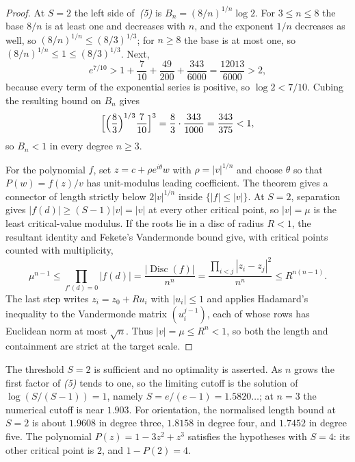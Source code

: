 \begin{proof}
At $S=2$ the left side of~\emph{(5)} is $B_n=(8/n)^{1/n}\log2$.  For
$3\le n\le8$ the base $8/n$ is at least one and decreases with $n$, and the
exponent $1/n$ decreases as well, so $(8/n)^{1/n}\le(8/3)^{1/3}$; for $n\ge8$
the base is at most one, so $(8/n)^{1/n}\le1\le(8/3)^{1/3}$.  Next,
\[
 e^{7/10}>1+\frac7{10}+\frac{49}{200}+\frac{343}{6000}
        =\frac{12013}{6000}>2,
\]
because every term of the exponential series is positive, so $\log2<7/10$.
Cubing the resulting bound on $B_n$ gives
\[
 \Bigl[\Bigl(\frac83\Bigr)^{1/3}\frac7{10}\Bigr]^{3}
 =\frac83\cdot\frac{343}{1000}=\frac{343}{375}<1,
\]
so $B_n<1$ in every degree $n\ge3$.

For the polynomial $f$, set $z=c+\rho e^{i\theta}w$ with
$\rho=|v|^{1/n}$ and choose $\theta$ so that $P(w)=f(z)/v$ has
unit-modulus leading coefficient.  The theorem gives a connector of length
strictly below $2|v|^{1/n}$ inside $\{|f|\le|v|\}$.  At $S=2$, separation
gives $|f(d)|\ge(S-1)|v|=|v|$ at every other critical point, so $|v|=\mu$ is
the least critical-value modulus.  If the roots lie in a disc of radius
$R<1$, the resultant identity and Fekete's Vandermonde bound give, with
critical points counted with multiplicity,
\[
 \mu^{n-1}
 \le \prod_{f'(d)=0}|f(d)|
 =\frac{|\operatorname{Disc}(f)|}{n^n}
 =\frac{\prod_{i<j}|z_i-z_j|^2}{n^n}
 \le R^{n(n-1)}.
\]
The last step writes $z_i=z_0+Ru_i$ with $|u_i|\le1$ and applies Hadamard's
inequality to the Vandermonde matrix $(u_i^{j-1})$, each of whose rows has
Euclidean norm at most $\sqrt n$.  Thus $|v|=\mu\le R^n<1$, so both the length
and containment are strict at the target scale.
\end{proof}

The threshold $S=2$ is sufficient and no optimality is asserted.  As $n$ grows
the first factor of \emph{(5)} tends to one, so the limiting cutoff is the
solution of $\log(S/(S-1))=1$, namely $S=e/(e-1)=1.5820\ldots$; at $n=3$ the
numerical cutoff is near $1.903$.  For orientation, the normalised length bound at
$S=2$ is about $1.9608$ in degree three, $1.8158$ in degree four, and
$1.7452$ in degree five.  The polynomial $P(z)=1-3z^2+z^3$ satisfies the
hypotheses with $S=4$: its other critical point is $2$, and $1-P(2)=4$.

